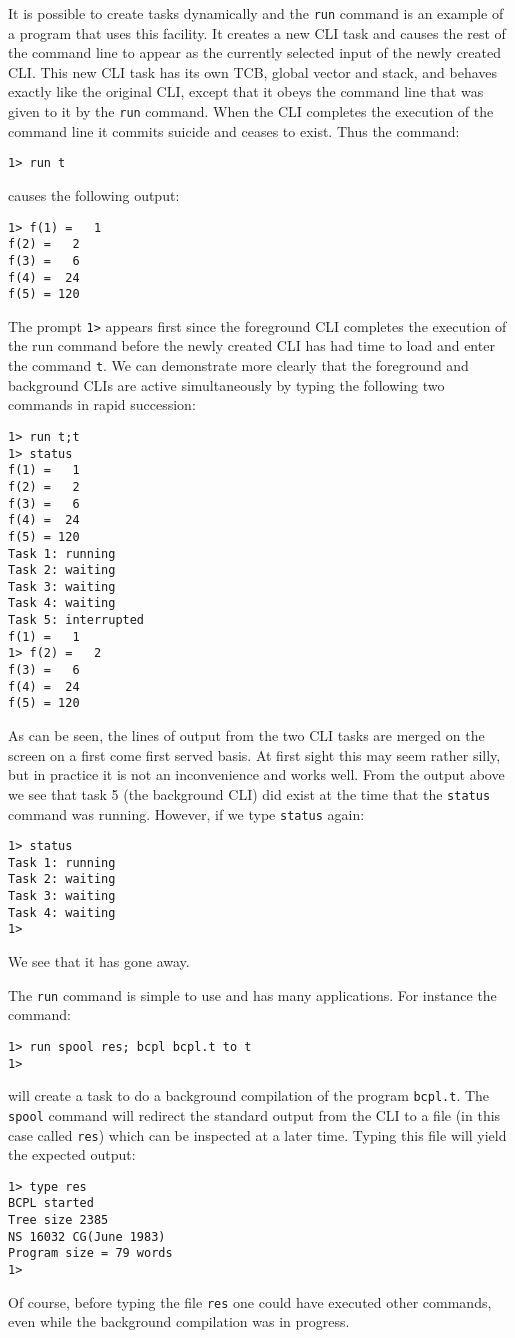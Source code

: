      It is possible to create tasks dynamically and the \verb|run|
command is an example of a program that uses this facility.  It
creates a new CLI task and causes the rest of the command line to
appear as the currently selected input of the newly created CLI.  This
new CLI task has its own TCB, global vector and stack, and behaves
exactly like the original CLI, except that it obeys the command line
that was given to it by the \verb|run| command.  When the CLI
completes the execution of the command line it commits suicide and
ceases to exist.  Thus the command:
\begin{verbatim}
1> run t
\end{verbatim}
\noindent
causes the following output:
\begin{verbatim}
1> f(1) =   1
f(2) =   2
f(3) =   6
f(4) =  24
f(5) = 120
\end{verbatim}
\noindent
The prompt \verb|1>| appears first since the foreground CLI completes
the execution of the run command before the newly created CLI has had
time to load and enter the command \verb|t|.  We can demonstrate more
clearly that the foreground and background CLIs are active
simultaneously by typing the following two commands in rapid
succession:
\begin{verbatim}
1> run t;t
1> status
f(1) =   1
f(2) =   2
f(3) =   6
f(4) =  24
f(5) = 120
Task 1: running
Task 2: waiting
Task 3: waiting
Task 4: waiting
Task 5: interrupted
f(1) =   1
1> f(2) =   2
f(3) =   6
f(4) =  24
f(5) = 120
\end{verbatim}
As can be seen, the lines of output from the two CLI tasks are merged
on the screen on a first come first served basis.  At first sight this
may seem rather silly, but in practice it is not an inconvenience and
works well.  From the output above we see that task 5 (the background
CLI) did exist at the time that the \verb|status| command was running.
However, if we type \verb|status| again:
\begin{verbatim}
1> status
Task 1: running
Task 2: waiting
Task 3: waiting
Task 4: waiting
1>
\end{verbatim}
\noindent
We see that it has gone away.

     The \verb|run| command is simple to use and has many
applications.  For instance the command:
\begin{verbatim}
1> run spool res; bcpl bcpl.t to t
1>
\end{verbatim}
\noindent
will create a task to do a background compilation of the program
\verb|bcpl.t|.  The \verb|spool| command will redirect the standard
output from the CLI to a file (in this case called \verb|res|) which
can be inspected at a later time.  Typing this file will yield the
expected output:
\begin{verbatim}
1> type res
BCPL started
Tree size 2385
NS 16032 CG(June 1983)
Program size = 79 words
1>
\end{verbatim}
Of course, before typing the file \verb|res| one could have executed other 
commands, even while the background compilation was in progress.

